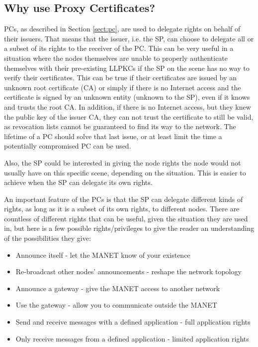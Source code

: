 \subsection{Why use Proxy Certificates?}
\acp{PC}, as described in Section \ref{sect:pc}, are used to delegate
rights on behalf of their issuers. That means that the issuer, i.e. the \ac{SP},
can choose to delegate all or a subset of its rights to the receiver of the
\ac{PC}. This can be very useful in a situation where the nodes themselves are
unable to properly authenticate themselves with their pre-existing \acp{LLPKC}
if the \ac{SP} on the scene has no way to verify their certificates. This can be
true if their certificates are issued by an unknown root certificate (\ac{CA})
or simply if there is no Internet access and the certificate is signed by an
unknown entity (unknown to the \ac{SP}), even if it knows and trusts the root
\ac{CA}. In addition, if there is no Internet access, but they knew the public
key of the issuer \ac{CA}, they can not trust the certificate to still be valid,
as revocation lists cannot be guaranteed to find its way to the network. The
lifetime of a \ac{PC} should solve that last issue, or at least limit the time a
potentially compromised \ac{PC} can be used.

Also, the \ac{SP} could be interested in giving the node rights the node would
not usually have on this specific scene, depending on the situation. This is
easier to achieve when the \ac{SP} can delegate its own rights.

An important feature of the \acp{PC} is that the \ac{SP} can delegate different
kinds of rights, as long as it is a subset of its own rights, to different
nodes. There are countless of different rights that can be useful, given the situation
they are used in, but here is a few possible rights/privileges to give the
reader an understanding of the possibilities they give:

\begin{itemize}
  \item Announce itself - let the \ac{MANET} know of your existence
  \item Re-broadcast other nodes' announcements - reshape the network topology
  \item Announce a gateway - give the \ac{MANET} access to another network
  \item Use the gateway - allow you to communicate outside the \ac{MANET}
  \item Send and receive messages with a defined application - full application
  rights
  \item Only receive messages from a defined application - limited application
  rights
\end{itemize}

